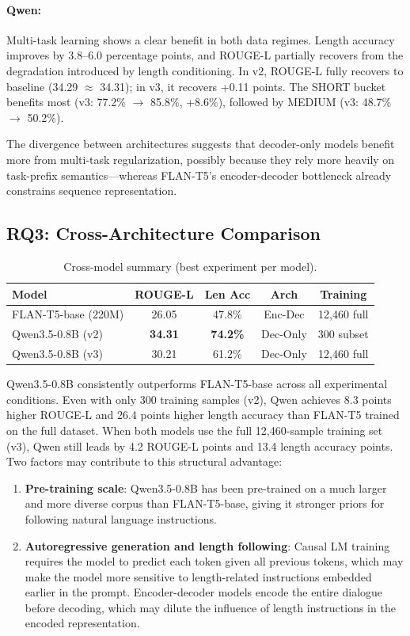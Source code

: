 \documentclass[11pt,a4paper]{article}
\begin{document}
\paragraph{Qwen:}
Multi-task learning shows a clear benefit in both data regimes.
Length accuracy improves by 3.8--6.0 percentage points, and ROUGE-L partially recovers from the degradation introduced by length conditioning.
In v2, ROUGE-L fully recovers to baseline (34.29 $\approx$ 34.31); in v3, it recovers +0.11 points.
The SHORT bucket benefits most (v3: 77.2\% $\to$ 85.8\%, +8.6\%), followed by MEDIUM (v3: 48.7\% $\to$ 50.2\%).

The divergence between architectures suggests that decoder-only models benefit more from multi-task regularization, possibly because they rely more heavily on task-prefix semantics---whereas FLAN-T5's encoder-decoder bottleneck already constrains sequence representation.

\subsection{RQ3: Cross-Architecture Comparison}

\begin{table}[t]
\centering
\caption{Cross-model summary (best experiment per model).}
\label{tab:cross-model}
\small
\begin{tabular}{@{}lcccc@{}}
\toprule
\textbf{Model} & \textbf{ROUGE-L} & \textbf{Len Acc} & \textbf{Arch} & \textbf{Training} \\
\midrule
FLAN-T5-base (220M) & 26.05 & 47.8\% & Enc-Dec & 12,460 full \\
Qwen3.5-0.8B (v2) & \textbf{34.31} & \textbf{74.2\%} & Dec-Only & 300 subset \\
Qwen3.5-0.8B (v3) & 30.21 & 61.2\% & Dec-Only & 12,460 full \\
\bottomrule
\end{tabular}
\end{table}

Qwen3.5-0.8B consistently outperforms FLAN-T5-base across all experimental conditions.
Even with only 300 training samples (v2), Qwen achieves 8.3 points higher ROUGE-L and 26.4 points higher length accuracy than FLAN-T5 trained on the full dataset.
When both models use the full 12,460-sample training set (v3), Qwen still leads by 4.2 ROUGE-L points and 13.4 length accuracy points.
Two factors may contribute to this structural advantage:

\begin{enumerate}[nosep]
  \item \textbf{Pre-training scale}: Qwen3.5-0.8B has been pre-trained on a much larger and more diverse corpus than FLAN-T5-base, giving it stronger priors for following natural language instructions.
  \item \textbf{Autoregressive generation and length following}: Causal LM training requires the model to predict each token given all previous tokens, which may make the model more sensitive to length-related instructions embedded earlier in the prompt. Encoder-decoder models encode the entire dialogue before decoding, which may dilute the influence of length instructions in the encoded representation.
\end{enumerate}
\end{document}
